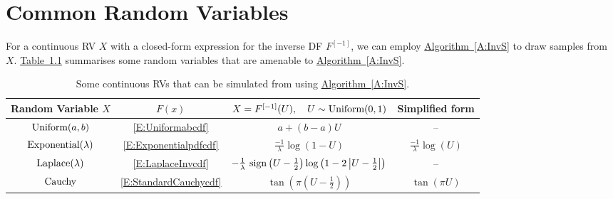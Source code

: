 \chapter{Common Random Variables}\label{S:CommonRVs}

For a continuous RV $X$ with a closed-form expression for the inverse DF $F^{[-1]}$, we can employ \hyperref[A:InvS]{Algorithm~\ref*{A:InvS}} to draw samples from $X$.  \hyperref[T:ContinRVsInvS]{Table~\ref*{T:ContinRVsInvS}}  summarises some random variables that are amenable to \hyperref[A:InvS]{Algorithm~\ref*{A:InvS}}.

\begin{table}[htpb]
\begin{center}
\caption{Some continuous RVs that can be simulated from using \hyperref[A:InvS]{Algorithm~\ref*{A:InvS}}. \label{T:ContinRVsInvS}}
\begin{tabular}{| c | c | c | c |}
\hline
Random Variable $X$ & $F(x)$ & $X=F^{[-1]}(U), \quad U \sim \mbox{{\rm Uniform}}(0,1)$ & Simplified form \\ \hline
$\mbox{{\rm Uniform}}(a,b)$ &
\eqref{E:Uniformabcdf} & $a+(b-a)U$ & -- \\
$\mbox{{\rm Exponential}}(\lambda)$ & \eqref{E:Exponentialpdfcdf} & $\frac{-1}{\lambda} \log(1-U)$ &  $\frac{-1}{\lambda} \log(U)$ \\
$\mbox{{\rm Laplace}}(\lambda)$ & \eqref{E:LaplaceInvcdf} & $- \frac{1}{\lambda} \ {\mathop{\rm sign}}\left( U-\frac{1}{2}\right) \log \left(1 - 2 \left| U-\frac{1}{2} \right| \right)$ & -- \\
$\mbox{{\rm Cauchy}}$ & \eqref{E:StandardCauchycdf} & $\tan \left(\pi \left(U- \frac{1}{2} \right) \right)$ & $\tan \left(\pi U \right)$ \\
\hline
\end{tabular}
\end{center}
\end{table}

